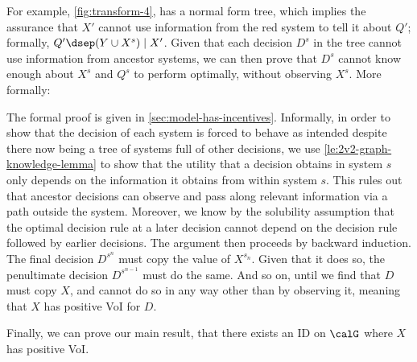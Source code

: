For example, \cref{fig:transform-4}, has a normal form tree, 
which implies the assurance that $X'$ cannot use information from the red system 
to tell it about $Q'$; formally, $Q' \dsep (Y \cup X^s) \mid X'$. %
Given that each decision $D^s$ in the tree cannot use information from ancestor systems, we can then 
prove that $D^s$
cannot know enough about $X^s$ and $Q^s$ to 
perform optimally, without observing $X^s$.
More formally: ~




The formal proof is given in \cref{sec:model-has-incentives}.
Informally, in order to show that the decision of each system is forced to behave as intended despite there now being a tree of systems full of other decisions, we use \cref{le:2v2-graph-knowledge-lemma} to show that the utility that a decision obtains in system $s$ only depends on the information it obtains from within system $s$. This rules out that ancestor decisions can observe and pass along relevant information via a path outside the system. 
Moreover, we know by the solubility assumption that the optimal decision rule at a later decision 
cannot depend on the decision rule followed by earlier decisions.
The argument then proceeds by backward induction.
The final decision $D^{s^n}$ must copy the value of $X^{s_n}$.
Given that it does so, the penultimate decision $D^{s^{n-1}}$ must do the same.
And so on, until we find that 
$D$ must copy $X$, and cannot do so in any way other than by observing it, 
meaning that $X$ has positive VoI for $D$.~






Finally, we can prove our main result, that there exists an ID on $\calG$ where $X$ has positive VoI. 





